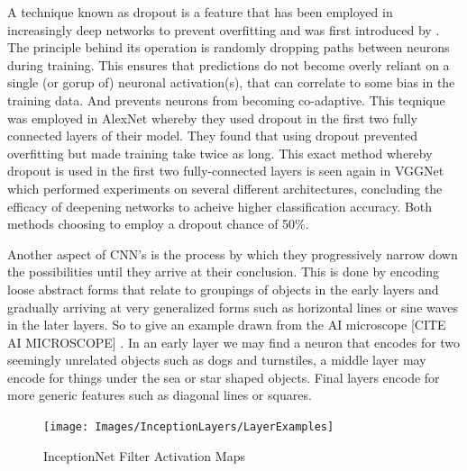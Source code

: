   A technique known as dropout is a feature that has been employed in increasingly deep networks to prevent overfitting and was first introduced by \cite{Srivastava2014}. The principle behind its operation is randomly dropping paths between neurons during training. This ensures that predictions do not become overly reliant on a single (or gorup of) neuronal activation(s), that can correlate to some bias in the training data. And prevents neurons from becoming co-adaptive. This teqnique was employed in AlexNet \cite{Krizhevsky} whereby they used dropout in the first two fully connected layers of their model. They found that using dropout prevented overfitting but made training take twice as long. This exact method whereby dropout is used in the first two fully-connected layers is seen again in VGGNet\cite{Simonyan2015} which performed experiments on several different architectures, concluding the efficacy of deepening networks to acheive higher classification accuracy. Both methods choosing to employ a dropout chance of 50\%.
  \par
  Another aspect of CNN's is the process by which they progressively narrow down the possibilities until they arrive at their conclusion. This is done by encoding loose abstract forms that relate to groupings of objects in the early layers and gradually arriving at very generalized forms such as horizontal lines or sine waves in the later layers. So to give an example drawn from the AI microscope [CITE AI MICROSCOPE] . In an early layer  we may find a neuron that encodes for two seemingly unrelated objects such as dogs and turnstiles, a middle layer may encode for things under the sea or star shaped objects. Final layers encode for more generic features such as diagonal lines or squares. %
  \par

  \begin{landscape}
    \begin{figure}[H]
      \begin{center}
        \texttt{[image: Images/InceptionLayers/LayerExamples]}
        \caption{InceptionNet Filter Activation Maps}
        \label{fig:inceptionNet_filter_activation}
      \end{center}
    \end{figure}
  \end{landscape}
  \par

